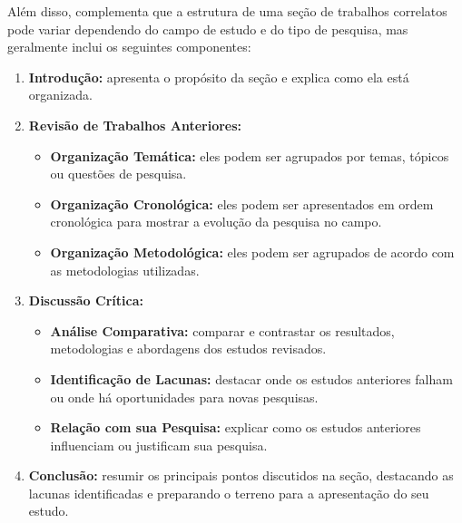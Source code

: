 Além disso,  complementa que a estrutura de uma seção de trabalhos correlatos pode variar dependendo do campo de estudo e do tipo de pesquisa, mas geralmente inclui os seguintes componentes:
\begin{enumerate}[label=\roman*., itemsep=0pt, leftmargin=2.5cm]
    \item \textbf{Introdução:} apresenta o propósito da seção e explica como ela está organizada.
    \item \textbf{Revisão de Trabalhos Anteriores:}
        \begin{itemize}
            \item \textbf{Organização Temática:} eles podem ser agrupados por temas, tópicos ou questões de pesquisa.
            \item \textbf{Organização Cronológica:} eles podem ser apresentados em ordem cronológica para mostrar a evolução da pesquisa no campo.
            \item \textbf{Organização Metodológica:} eles podem ser agrupados de acordo com as metodologias utilizadas.
        \end{itemize}
    \item \textbf{Discussão Crítica:}
        \begin{itemize}
            \item \textbf{Análise Comparativa:} comparar e contrastar os resultados, metodologias e abordagens dos estudos revisados.
            \item \textbf{Identificação de Lacunas:} destacar onde os estudos anteriores falham ou onde há oportunidades para novas pesquisas.
            \item \textbf{Relação com sua Pesquisa:} explicar como os estudos anteriores influenciam ou justificam sua pesquisa.
        \end{itemize}
    \item \textbf{Conclusão:} resumir os principais pontos discutidos na seção, destacando as lacunas identificadas e preparando o terreno para a apresentação do seu estudo.
\end{enumerate}

